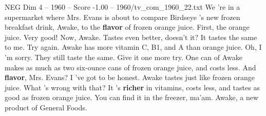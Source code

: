 \begin{textsample}{NEG Dim 4 – 1960 – Score -1.00 – 1960/tv\_com\_1960\_22.txt}  \label{ex:f4_neg_088}
We 're in a supermarket where Mrs.
Evans is about to compare Birdseye 's new frozen breakfast drink, Awake, to the \textbf{flavor} of frozen orange juice.
First, the orange juice.
Very good!
Now, Awake.
Tastes even better, doesn't it?
It tastes the same to me.
Try again.
Awake has more vitamin C, B1, and A than orange juice.
Oh, I 'm sorry.
They still taste the same.
Give it one more try.
One can of Awake makes as much as two six-ounce cans of frozen orange juice, and costs less.
And \textbf{flavor}, Mrs.
Evans?
I 've got to be honest.
Awake tastes just like frozen orange juice.
What 's wrong with that?
It 's \textbf{richer} in vitamins, costs less, and tastes as good as frozen orange juice.
You can find it in the freezer, ma'am.
Awake, a new product of General Foods.

\end{textsample}
